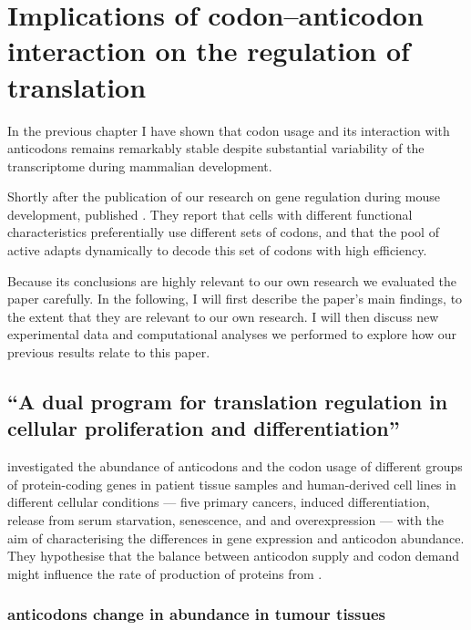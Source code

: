 \chapter{Implications of codon–anticodon interaction on the regulation of
translation}

In the previous chapter I have shown that codon usage and its interaction with
\trna anticodons remains remarkably stable despite substantial variability of
the transcriptome during mammalian development.

Shortly after the publication of our research on \trna gene regulation during
mouse development, \citet{Gingold:2014} published . They
report that cells with different functional characteristics preferentially use
different sets of codons, and that the pool of active \trna[s] adapts
dynamically to decode this set of codons with high efficiency.

Because its conclusions are highly relevant to our own research we evaluated the
paper carefully. In the following, I will first describe the paper’s main
findings, to the extent that they are relevant to our own research. I will then
discuss new experimental data and computational analyses we performed to explore
how our previous results relate to this paper.

\section{“A dual program for translation regulation in cellular proliferation
and differentiation”}

\citet{Gingold:2014} investigated the abundance of \trna anticodons and the
codon usage of different groups of protein-coding genes in patient tissue
samples and human-derived cell lines in different cellular conditions --- five
primary cancers, induced differentiation, release from serum starvation,
senescence, and  and  overexpression --- with the
aim of characterising the differences in \trna gene expression and \trna
anticodon abundance. They hypothesise that the balance between \trna anticodon
supply and codon demand might influence the rate of production of proteins from
\mrna \citep{Gingold:2011}.

\subsection{ anticodons change in abundance in tumour tissues}

